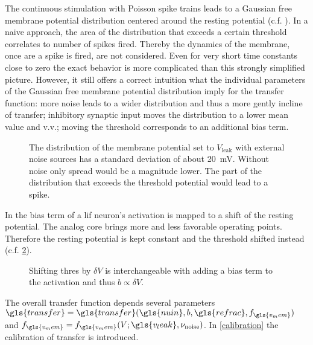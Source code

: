 The continuous stimulation with Poisson spike trains leads to a Gaussian free membrane potential distribution centered around the resting potential (c.f. \cite{petrovici12phdthesis}). In a naive approach, the area of the distribution that exceeds a certain threshold correlates to number of spikes fired. Thereby the dynamics of the membrane, once are a spike is fired, are not considered. Even for very short time constants close to zero the exact behavior is more complicated than this strongly simplified picture. However, it still offers a correct intuition what the individual parameters of the Gaussian free membrane potential distribution imply for the transfer function: more noise leads to a wider distribution and thus a more gently incline of \gls{transfer}; inhibitory synaptic input moves the distribution to a lower mean value and v.v.; moving the threshold corresponds to an additional bias term.

\begin{figure}
	\label{vleak_w_noise}
	\begin{center}
		
	\end{center}
	\caption{The distribution of the membrane potential set to $V_{\text{leak}}$ with external noise sources has a standard deviation of about \SI{20}{\milli\V}. Without noise only spread would be a magnitude lower. The part of the distribution that exceeds the threshold potential would lead to a spike.}
\end{figure}

In \cite{petrovici2016stochastic} the bias term of a \gls{lif} neuron's activation is mapped to a shift of the resting potential. The analog core brings more and less favorable operating points. Therefore the resting potential is kept constant and the threshold shifted instead (c.f. \cref{transferfunction_with_bias}).

\begin{figure}
	\label{transferfunction_with_bias}
	\begin{center}
		
	\end{center}
	\caption{Shifting \gls{thres} by $\delta V$ is interchangeable with adding a bias term to the activation and thus $b \propto \delta V$.}
\end{figure}

The overall transfer function depends several parameters $\gls{transfer} = \gls{transfer}(\gls{nuin}, b, \gls{refrac}, f_{\gls{v_mem}})$ and $f_{\gls{v_mem}} = f_{\gls{v_mem}}(V; \gls{v_leak}, \nu_\text{noise})$. In \cref{calibration} the calibration of \gls{transfer} is introduced.

